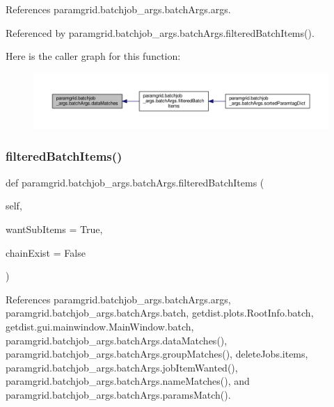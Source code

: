 References paramgrid.\+batchjob\+\_\+args.\+batch\+Args.\+args.



Referenced by paramgrid.\+batchjob\+\_\+args.\+batch\+Args.\+filtered\+Batch\+Items().

Here is the caller graph for this function\+:
\nopagebreak
\begin{figure}[H]
\begin{center}
\leavevmode
\includegraphics[width=350pt]{classparamgrid_1_1batchjob__args_1_1batchArgs_a2837820592cdee214b7afc3dfd2a2b13_icgraph}
\end{center}
\end{figure}
\mbox{\label{classparamgrid_1_1batchjob__args_1_1batchArgs_a1367a161802a65eaeba85b94b487943e}} 
\subsubsection{\texorpdfstring{filtered\+Batch\+Items()}{filteredBatchItems()}}
{\footnotesize\ttfamily def paramgrid.\+batchjob\+\_\+args.\+batch\+Args.\+filtered\+Batch\+Items (\begin{DoxyParamCaption}\item[{}]{self,  }\item[{}]{want\+Sub\+Items = {\ttfamily True},  }\item[{}]{chain\+Exist = {\ttfamily False} }\end{DoxyParamCaption})}



References paramgrid.\+batchjob\+\_\+args.\+batch\+Args.\+args, paramgrid.\+batchjob\+\_\+args.\+batch\+Args.\+batch, getdist.\+plots.\+Root\+Info.\+batch, getdist.\+gui.\+mainwindow.\+Main\+Window.\+batch, paramgrid.\+batchjob\+\_\+args.\+batch\+Args.\+data\+Matches(), paramgrid.\+batchjob\+\_\+args.\+batch\+Args.\+group\+Matches(), delete\+Jobs.\+items, paramgrid.\+batchjob\+\_\+args.\+batch\+Args.\+job\+Item\+Wanted(), paramgrid.\+batchjob\+\_\+args.\+batch\+Args.\+name\+Matches(), and paramgrid.\+batchjob\+\_\+args.\+batch\+Args.\+params\+Match().




